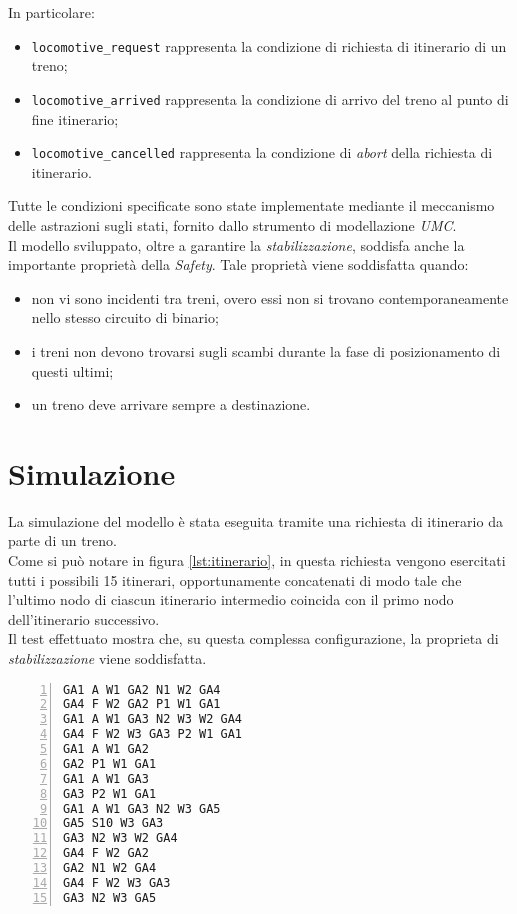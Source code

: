\documentclass[10pt,a4paper,oneside]{report}
\begin{document}
In particolare:
\begin{itemize}
\item \verb!locomotive_request! rappresenta la condizione di richiesta di itinerario di un treno;
\item \verb!locomotive_arrived! rappresenta la condizione di arrivo del treno al punto di fine itinerario;
\item \verb!locomotive_cancelled! rappresenta la condizione di \emph{abort} della richiesta di itinerario.
\end{itemize}

Tutte le condizioni specificate sono state implementate mediante il meccanismo delle astrazioni sugli stati, fornito dallo strumento di modellazione \emph{UMC}.\\
Il modello sviluppato, oltre a garantire la \emph{stabilizzazione}, soddisfa anche la importante proprietà della \emph{Safety}. Tale proprietà viene soddisfatta quando:
\begin{itemize}
\item non vi sono incidenti tra treni, overo essi non si trovano contemporaneamente nello stesso circuito di binario;
\item i treni non devono trovarsi sugli scambi durante la fase di posizionamento di questi ultimi;
\item un treno deve arrivare sempre a destinazione.
\end{itemize}

\chapter{Simulazione}
\label{cap:simulation}
La simulazione del modello è stata eseguita tramite una richiesta di itinerario da parte di un treno.\\ Come si può notare in figura \ref{lst:itinerario}, in questa richiesta vengono esercitati tutti i possibili 15 itinerari, opportunamente concatenati di modo tale che l'ultimo nodo di ciascun itinerario intermedio coincida con il primo nodo dell'itinerario successivo.\\
Il test effettuato mostra che, su questa complessa configurazione, la proprieta di \emph{stabilizzazione} viene soddisfatta.

\begin{lstlisting}[numbers=left,
numberstyle=\tiny,caption={Simulazione di itinerario effettuata},
label=lst:itinerario]
GA1 A W1 GA2 N1 W2 GA4
GA4 F W2 GA2 P1 W1 GA1
GA1 A W1 GA3 N2 W3 W2 GA4
GA4 F W2 W3 GA3 P2 W1 GA1
GA1 A W1 GA2
GA2 P1 W1 GA1
GA1 A W1 GA3
GA3 P2 W1 GA1
GA1 A W1 GA3 N2 W3 GA5
GA5 S10 W3 GA3
GA3 N2 W3 W2 GA4
GA4 F W2 GA2
GA2 N1 W2 GA4
GA4 F W2 W3 GA3
GA3 N2 W3 GA5
\end{lstlisting}
\end{document}

